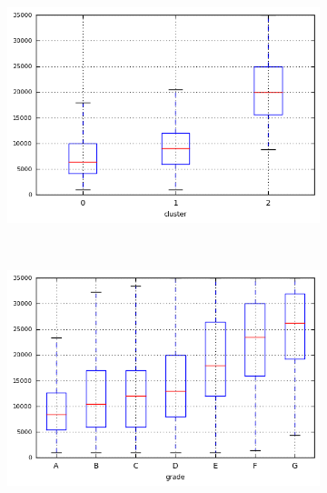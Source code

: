 \begin{anexosenv}
\begin{figure}[t!]
\begin{subfigure}[t]{0.45\textwidth}
        \end{subfigure}
\end{figure}



\begin{figure}[ht!]
    \centering
                \caption{\emph{Boxplots} de loan\textunderscore amnt}
        \begin{subfigure}[t]{0.45\textwidth}
            \centering

            \centerline{\includegraphics[width=1.05\textwidth]{img/loan_amnt_by_cluster}}
        \end{subfigure}%
        ~ 
        \begin{subfigure}[t]{0.45\textwidth}
            \centering
   
            \centerline{\includegraphics[width=1.05\textwidth]{img/loan_amnt_by_grade}}


\end{subfigure}
\end{figure}
\end{anexosenv}
